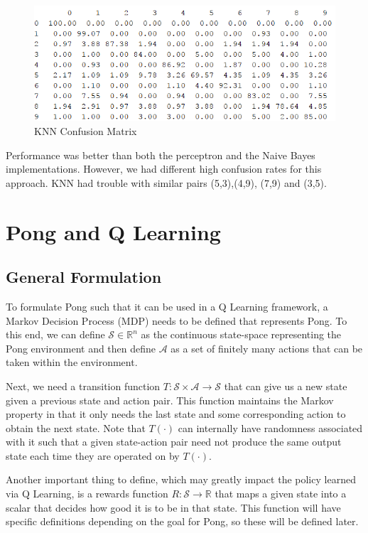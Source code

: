 \documentclass{article}[12pt]
\begin{document}
   \begin{figure}[!htb]
   	\centering
   	\includegraphics[scale=0.9]{confusion_knn.png}
   	\caption{KNN Confusion Matrix}
   	\label{fig:cm31}
   \end{figure}
   
   Performance was better than both the perceptron and the Naive Bayes implementations. However, we had different high confusion rates for this approach. KNN had trouble with similar pairs (5,3),(4,9), (7,9) and (3,5).
   
   
   
   
   \section{Pong and Q Learning} \label{sec:two}
   \subsection{General Formulation} \label{sec:pongform}
   To formulate Pong such that it can be used in a Q Learning framework, a Markov Decision Process (MDP) needs to be defined that represents Pong. To this end, we can define $\mathcal{S} \in \mathbb{R}^n$ as the continuous state-space representing the Pong environment and then define $\mathcal{A}$ as a set of finitely many actions that can be taken within the environment. 
   
   Next, we need a transition function $T: \mathcal{S} \times \mathcal{A} \rightarrow \mathcal{S}$ that can give us a new state given a previous state and action pair. This function maintains the Markov property in that it only needs the last state and some corresponding action to obtain the next state. Note that $T(\cdot)$ can internally have randomness associated with it such that a given state-action pair need not produce the same output state each time they are operated on by $T(\cdot)$.
   
   Another important thing to define, which may greatly impact the policy learned via Q Learning, is a rewards function $R: \mathcal{S} \rightarrow \mathbb{R}$ that maps a given state into a scalar that decides how good it is to be in that state. This function will have specific definitions depending on the goal for Pong, so these will be defined later.
   
\end{document}
